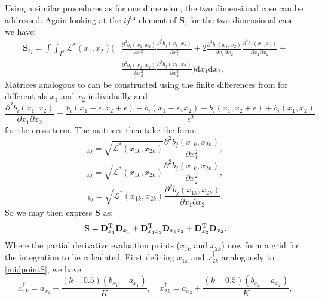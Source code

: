 Using a similar procedures as for one dimension, the two dimensional case can be addressed. Again looking at the $ij^\text{th}$ element of $\mathbf{S}$, for the two dimensional case we have:
\begin{align*}
\mathbf{S}_{ij}= \int\int_{\Gamma^\prime} \mathcal{L}^*(x_1,x_2) \Bigg ( & \frac{\partial^2 b_i(x_1,x_2)}{\partial x_1^2}\frac{\partial^2 b_j(x_1,x_2)}{\partial x_1^2}+2\frac{\partial^2 b_i(x_1,x_2)}{\partial x_1 \partial x_2}\frac{\partial^2 b_j(x_1,x_2)}{\partial x_1 \partial x_2}+ \\ 
& \frac{\partial^2 b_i(x_1,x_2)}{\partial x_2^2}\frac{\partial^2 b_j(x_1,x_2)}{\partial x_2^2} \Bigg )  \text{d}x_1\text{d}x_2.
\end{align*}
Matrices analogous to  can be constructed using the finite differences from  for differentials $x_1$ and $x_2$ individually and
\begin{equation*}
\frac{\partial^2 b_i(x_1,x_2)}{\partial x_1 \partial x_2} = \frac{ b_i(x_1+\epsilon,x_2+\epsilon) - b_i(x_1+\epsilon,x_2) - b_i(x_1,x_2+\epsilon) + b_i(x_1,x_2)}{\epsilon^2},
\end{equation*}
for the cross term. The matrices then take the form:
\begin{equation*}
[\mathbf{D}_{x_1}]_{kj}=\sqrt{\mathcal{L}^*(x_{1k},x_{2k})} \frac{\partial^2 b_j(x_{1k},x_{2k})}{\partial x_1^2},
\end{equation*}
\begin{equation*}
[\mathbf{D}_{x_2}]_{kj}=\sqrt{\mathcal{L}^*(x_{1k},x_{2k})} \frac{\partial^2 b_j(x_{1k},x_{2k})}{\partial x_2^2},
\end{equation*}
\begin{equation*}
[\mathbf{D}_{x_1 x_2}]_{kj}=\sqrt{\mathcal{L}^*(x_{1k},x_{2k})} \frac{\partial^2 b_j(x_{1k},x_{2k})}{\partial x_1 \partial x_2}.
\end{equation*}
So we may then express $\mathbf{S}$ as:
\begin{equation*}
\mathbf{S}=\mathbf{D}_{x_1}^{\text{T}}\mathbf{D}_{x_1} + \mathbf{D}_{x_1 x_2}^{\text{T}}\mathbf{D}_{x_1 x_2} + \mathbf{D}_{x_2}^{\text{T}}\mathbf{D}_{x_2}.
\end{equation*}
Where the partial derivative evaluation points ($x_{1k}$ and $x_{2k}$) now form a grid for the integration to be calculated. First defining $x^\dagger_{1k}$ and $x^\dagger_{2k}$ analogously to \ref{midpointS}, we have:
\begin{equation*}
x^\dagger_{1k}=a_{x_1}+\frac{(k-0.5)(b_{x_1}-a_{x_1})}{K},\quad
x^\dagger_{2k}=a_{x_2}+\frac{(k-0.5)(b_{x_2}-a_{x_2})}{K},
\end{equation*}
